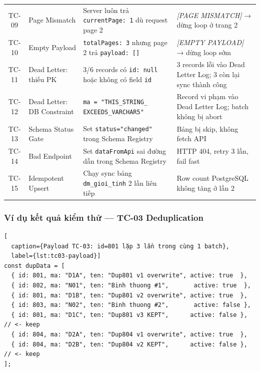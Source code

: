 \begin{longtable}{cp{3cm}p{5cm}p{4.5cm}}
TC-09 & Page Mismatch
  & Server luôn trả \texttt{currentPage: 1} dù request page 2
  & \textit{[PAGE MISMATCH]} → dừng loop ở trang 2 \\[4pt]

TC-10 & Empty Payload
  & \texttt{totalPages: 3} nhưng page 2 trả \texttt{payload: []}
  & \textit{[EMPTY PAYLOAD]} → dừng loop sớm \\[4pt]

TC-11 & Dead Letter: thiếu PK
  & 3/6 records có \texttt{id: null} hoặc không có field \texttt{id}
  & 3 records lỗi vào Dead Letter Log; 3 còn lại sync thành công \\[4pt]

TC-12 & Dead Letter: DB Constraint
  & \texttt{ma = "THIS\_STRING\_} \texttt{EXCEEDS\_VARCHAR5"}
  & Record vi phạm vào Dead Letter Log; batch không bị abort \\[4pt]

TC-13 & Schema Status Gate
  & Set \texttt{status="changed"} trong Schema Registry
  & Bảng bị skip, không fetch API \\[4pt]

TC-14 & Bad Endpoint
  & Set \texttt{dataFromApi} sai đường dẫn trong Schema Registry
  & HTTP 404, retry 3 lần, fail fast \\[4pt]

TC-15 & Idempotent Upsert
  & Chạy sync bảng \texttt{dm\_gioi\_tinh} 2 lần liên tiếp
  & Row count PostgreSQL không tăng ở lần 2 \\

\end{longtable}

\subsubsection{Ví dụ kết quả kiểm thử — TC-03 Deduplication}

\begin{lstlisting}[
  caption={Payload TC-03: id=801 lặp 3 lần trong cùng 1 batch},
  label={lst:tc03-payload}]
const dupData = [
  { id: 801, ma: "D1A", ten: "Dup801 v1 overwrite", active: true  },
  { id: 802, ma: "N01", ten: "Binh thuong #1",       active: true  },
  { id: 801, ma: "D1B", ten: "Dup801 v2 overwrite", active: true  },
  { id: 803, ma: "N02", ten: "Binh thuong #2",       active: false },
  { id: 801, ma: "D1C", ten: "Dup801 v3 KEPT",      active: false }, // <- keep
  { id: 804, ma: "D2A", ten: "Dup804 v1 overwrite", active: true  },
  { id: 804, ma: "D2B", ten: "Dup804 v2 KEPT",      active: false }, // <- keep
];
\end{lstlisting}

